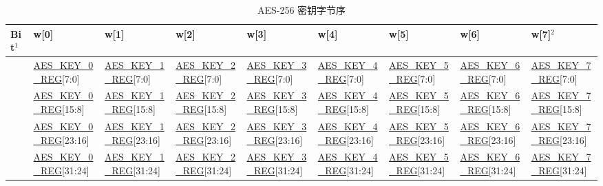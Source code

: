 \documentclass[main\_\_CN.tex]{subfiles}
\begin{document}
\begin{landscape}
\begin{threeparttable}

\begin{longtable}[c]
{ |l|l|l|l|l|l|l|l|l|}
\caption{AES-256 密钥字节序}\label{tab:aes-256-key-endian}\\
\hline 
\rowcolor{lightgray}
\textbf{Bit}$^1$ &   \textbf{w[0]}    &  \textbf{ w[1]}    &   \textbf{w[2]}    &   \textbf{w[3]}    &  \textbf{ w[4]}    &   \textbf{w[5]}& \textbf{   w[6]}    &   \textbf{w[7]}$^2$    \\\hline
[31:24]     &   \scriptsize \hyperref[regdesc:AESKEYnREG]{AES\_KEY\_0\_REG}[7:0]    &   \scriptsize \hyperref[regdesc:AESKEYnREG]{AES\_KEY\_1\_REG}[7:0]    &   \scriptsize \hyperref[regdesc:AESKEYnREG]{AES\_KEY\_2\_REG}[7:0]    &   \scriptsize \hyperref[regdesc:AESKEYnREG]{AES\_KEY\_3\_REG}[7:0]    &   \scriptsize \hyperref[regdesc:AESKEYnREG]{AES\_KEY\_4\_REG}[7:0]    &   \scriptsize \hyperref[regdesc:AESKEYnREG]{AES\_KEY\_5\_REG}[7:0]
& \scriptsize  \hyperref[regdesc:AESKEYnREG]{AES\_KEY\_6\_REG}[7:0]    &   \scriptsize \hyperref[regdesc:AESKEYnREG]{AES\_KEY\_7\_REG}[7:0]\\ \hline
[23:16]     &   \scriptsize \hyperref[regdesc:AESKEYnREG]{AES\_KEY\_0\_REG}[15:8]   &   \scriptsize \hyperref[regdesc:AESKEYnREG]{AES\_KEY\_1\_REG}[15:8]   &   \scriptsize \hyperref[regdesc:AESKEYnREG]{AES\_KEY\_2\_REG}[15:8]   &   \scriptsize \hyperref[regdesc:AESKEYnREG]{AES\_KEY\_3\_REG}[15:8]   &   \scriptsize \hyperref[regdesc:AESKEYnREG]{AES\_KEY\_4\_REG}[15:8]   &   \scriptsize \hyperref[regdesc:AESKEYnREG]{AES\_KEY\_5\_REG}[15:8]   &   \scriptsize \hyperref[regdesc:AESKEYnREG]{AES\_KEY\_6\_REG}[15:8]   &   \scriptsize \hyperref[regdesc:AESKEYnREG]{AES\_KEY\_7\_REG}[15:8]\\ \hline
[15:8]  &  \scriptsize \hyperref[regdesc:AESKEYnREG]{AES\_KEY\_0\_REG}[23:16]  &   \scriptsize \hyperref[regdesc:AESKEYnREG]{AES\_KEY\_1\_REG}[23:16]  &   \scriptsize \hyperref[regdesc:AESKEYnREG]{AES\_KEY\_2\_REG}[23:16]  &   \scriptsize \hyperref[regdesc:AESKEYnREG]{AES\_KEY\_3\_REG}[23:16]  &   \scriptsize \hyperref[regdesc:AESKEYnREG]{AES\_KEY\_4\_REG}[23:16]  &   \scriptsize \hyperref[regdesc:AESKEYnREG]{AES\_KEY\_5\_REG}[23:16]& \scriptsize \hyperref[regdesc:AESKEYnREG]{AES\_KEY\_6\_REG}[23:16]  &   \scriptsize \hyperref[regdesc:AESKEYnREG]{AES\_KEY\_7\_REG}[23:16]\\ \hline
[7:0]   &  \scriptsize \hyperref[regdesc:AESKEYnREG]{AES\_KEY\_0\_REG}[31:24]  &    \scriptsize \hyperref[regdesc:AESKEYnREG]{AES\_KEY\_1\_REG}[31:24]  & \scriptsize \hyperref[regdesc:AESKEYnREG]{AES\_KEY\_2\_REG}[31:24]    &   \scriptsize \hyperref[regdesc:AESKEYnREG]{AES\_KEY\_3\_REG}[31:24]  &   \scriptsize \hyperref[regdesc:AESKEYnREG]{AES\_KEY\_4\_REG}[31:24]  &   \scriptsize \hyperref[regdesc:AESKEYnREG]{AES\_KEY\_5\_REG}[31:24]& \scriptsize \hyperref[regdesc:AESKEYnREG]{AES\_KEY\_6\_REG}[31:24]  &   \scriptsize \hyperref[regdesc:AESKEYnREG]{AES\_KEY\_7\_REG}[31:24]\\ \hline
\end{longtable}


\end{threeparttable}
\end{landscape}
\end{document}
